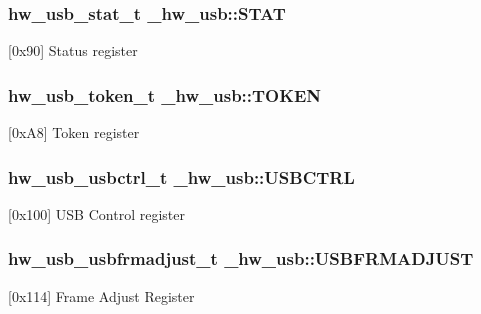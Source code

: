 \subsubsection[{\texorpdfstring{S\+T\+AT}{STAT}}]{ {\bf hw\+\_\+usb\+\_\+stat\+\_\+t} \+\_\+hw\+\_\+usb\+::\+S\+T\+AT}\hypertarget{struct__hw__usb_aea8baa970953ea0ac1a028e42c90e215}{}\label{struct__hw__usb_aea8baa970953ea0ac1a028e42c90e215}
\mbox{[}0x90\mbox{]} Status register 
\subsubsection[{\texorpdfstring{T\+O\+K\+EN}{TOKEN}}]{ {\bf hw\+\_\+usb\+\_\+token\+\_\+t} \+\_\+hw\+\_\+usb\+::\+T\+O\+K\+EN}\hypertarget{struct__hw__usb_aed79e25b1d1870ab7dcf65b869907eeb}{}\label{struct__hw__usb_aed79e25b1d1870ab7dcf65b869907eeb}
\mbox{[}0x\+A8\mbox{]} Token register 
\subsubsection[{\texorpdfstring{U\+S\+B\+C\+T\+RL}{USBCTRL}}]{ {\bf hw\+\_\+usb\+\_\+usbctrl\+\_\+t} \+\_\+hw\+\_\+usb\+::\+U\+S\+B\+C\+T\+RL}\hypertarget{struct__hw__usb_ae2ecf4e8c66c92d022914f0ffa21e395}{}\label{struct__hw__usb_ae2ecf4e8c66c92d022914f0ffa21e395}
\mbox{[}0x100\mbox{]} U\+SB Control register 
\subsubsection[{\texorpdfstring{U\+S\+B\+F\+R\+M\+A\+D\+J\+U\+ST}{USBFRMADJUST}}]{ {\bf hw\+\_\+usb\+\_\+usbfrmadjust\+\_\+t} \+\_\+hw\+\_\+usb\+::\+U\+S\+B\+F\+R\+M\+A\+D\+J\+U\+ST}\hypertarget{struct__hw__usb_abfb008e478f61789a4bbf3f25b538929}{}\label{struct__hw__usb_abfb008e478f61789a4bbf3f25b538929}
\mbox{[}0x114\mbox{]} Frame Adjust Register 
